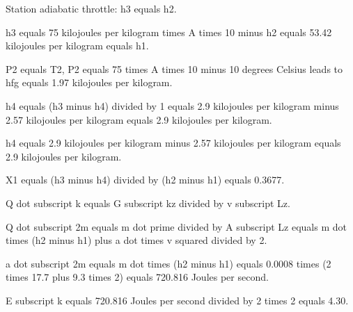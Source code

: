Station adiabatic throttle: h3 equals h2.

h3 equals 75 kilojoules per kilogram times A times 10 minus h2 equals 53.42 kilojoules per kilogram equals h1.

P2 equals T2, P2 equals 75 times A times 10 minus 10 degrees Celsius leads to hfg equals 1.97 kilojoules per kilogram.

h4 equals (h3 minus h4) divided by 1 equals 2.9 kilojoules per kilogram minus 2.57 kilojoules per kilogram equals 2.9 kilojoules per kilogram.

h4 equals 2.9 kilojoules per kilogram minus 2.57 kilojoules per kilogram equals 2.9 kilojoules per kilogram.

X1 equals (h3 minus h4) divided by (h2 minus h1) equals 0.3677.

Q dot subscript k equals G subscript kz divided by v subscript Lz.

Q dot subscript 2m equals m dot prime divided by A subscript Lz equals m dot times (h2 minus h1) plus a dot times v squared divided by 2.

a dot subscript 2m equals m dot times (h2 minus h1) equals 0.0008 times (2 times 17.7 plus 9.3 times 2) equals 720.816 Joules per second.

E subscript k equals 720.816 Joules per second divided by 2 times 2 equals 4.30.